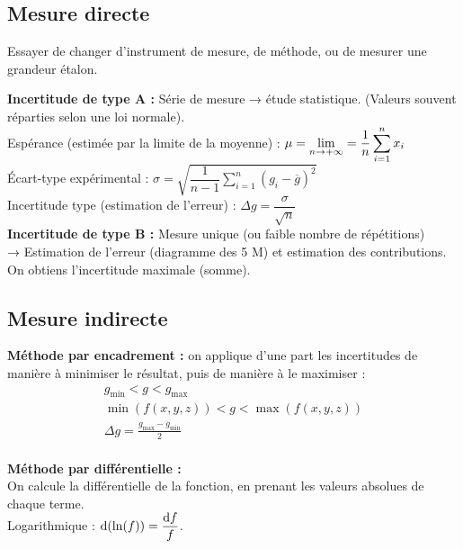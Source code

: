 \documentclass[13pt, twoside, a4paper, french]{report}
\begin{document}
    \begin{minipage}[t]{0.65\textwidth}%
      \subsection{Mesure directe}\label{subsec:mesure-directe}
        
        Essayer de changer d'instrument de mesure, de méthode, ou de mesurer une grandeur étalon.
        
        \textbf{Incertitude de type A :} Série de mesure → étude statistique. (Valeurs souvent réparties selon une loi normale).\\
        Espérance (estimée par la limite de la moyenne) : $\displaystyle \mu = \lim\limits_{n \to +\infty} = \dfrac{1}{n} \sum_{i=1}^{n} x_i$\\
        Écart-type expérimental : $\displaystyle \sigma = \sqrt{\dfrac{1}{n-1} \sum_{i=1}^{n} (g_i - \overline{g})^2}$\\
        Incertitude type (estimation de l'erreur) : $\Delta g = \dfrac{\sigma}{\sqrt{n}}$\\
        
        \textbf{Incertitude de type B :} Mesure unique (ou faible nombre de répétitions)\\
        → Estimation de l'erreur (diagramme des 5 M) et estimation des contributions.\\
        On obtiens l'incertitude maximale (somme).
    
    \end{minipage}\hspace{0.03\textwidth}
    \begin{minipage}[t]{0.32\textwidth}%
      \subsection{Mesure indirecte}\label{subsec:mesure-indirecte}
        
        \textbf{Méthode par encadrement :} on applique d'une part les incertitudes de manière à minimiser le résultat, puis de manière à le maximiser :
        \begin{gather*}
          g_{\min} < g < g_{\max}\\
          \min(f(x, y, z)) < g < \max(f(x, y, z))\\
          \Delta g = \frac{g_{\max} - g_{\min}}{2}\\
        \end{gather*}
        
        \textbf{Méthode par différentielle :}\\
          On calcule la différentielle de la fonction, en prenant les valeurs absolues de chaque terme.\\
          Logarithmique : $\textrm d(\ln(f)) = \dfrac{\textrm df}{f}$.
    
    \end{minipage}
\end{document}
